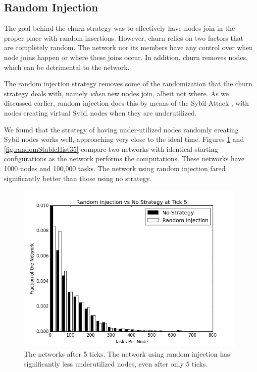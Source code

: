 \documentclass[10pt,conference]{IEEEtran}
\begin{document}
	\subsection{Random Injection}
	
	The goal behind the churn strategy was to effectively have nodes join in the proper place with random insertions.
	However, churn relies on two factors that are completely random.
	The network nor its members have any control over when node joins happen or where these joins occur.
	In addition, churn removes nodes, which can be detrimental to the network.
	
	The random injection strategy removes some of the randomization that the churn strategy deals with, namely \textit{when} new nodes join, albeit not where.
	As we discussed earlier, random injection does this by means of the Sybil Attack \cite{sybil}, with nodes creating virtual Sybil nodes when they are underutilized.
	
	We found that the strategy of having under-utilized nodes randomly creating Sybil nodes works well, approaching very close to the ideal time.
	Figures \ref{fig:randomStableHist5} and \ref{fig:randomStableHist35} compare two networks with identical starting configurations as the network performs the computations.
	These networks have 1000 nodes and 100,000 tasks.  
	The network using random injection fared significantly better than those using no strategy.
	
	
	\begin{figure}
		\centering
		\includegraphics[width=0.9\linewidth]{figs/randomStableHist5}
		\caption[Random injection vs no strategy after 5 ticks.]{The networks after 5 ticks.  The network using random injection has significantly less underutilized nodes, even after only 5 ticks.}
		\label{fig:randomStableHist5}
	\end{figure}
	
\end{document}
